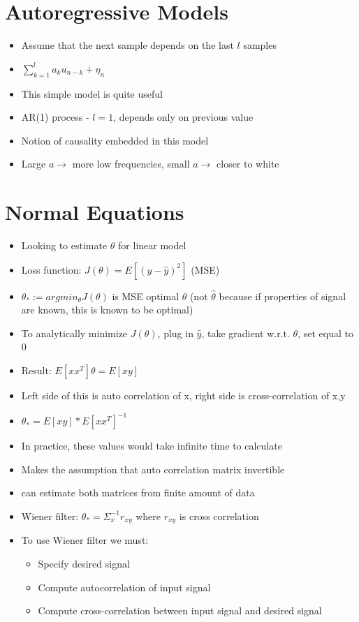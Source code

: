 \documentclass[12pt, letter]{article}
\begin{document}
\section{Autoregressive Models}%
\label{sec:autoregressive_models}
\begin{itemize}
	\item Assume that the next sample depends on the last $l$ samples
	\item $ \sum_{k=1}^{l} a_k u_{n-k} +\eta_n$
	\item This simple model is quite useful
	\item AR(1) process - $l=1$, depends only on previous value
	\item Notion of causality embedded in this model
	\item Large $a \to$ more low frequencies, small $a \to$ closer to white
\end{itemize}

\section{Normal Equations}%
\label{sec:normal_equations}
\begin{itemize}
	 \item Looking to estimate $\theta$ for linear model
	 \item Loss function: $J(\theta) = E[(y-\hat{y})^2]$ (MSE)
	 \item $\theta_* := argmin_\theta J(\theta)$ is MSE optimal $\theta$ (not $\hat{\theta}$ because if properties of signal are known, this is known to be optimal)
	 \item To analytically minimize $J(\theta)$, plug in $\hat{y}$, take gradient w.r.t. $\theta$, set equal to 0
	 \item Result: $E[x x^T]\theta = E[xy]$
	 \item Left side of this is auto correlation of x, right side is cross-correlation of x,y
	 \item $\theta_* = E[xy] * E[x x^T]^{-1}$
	 \item In practice, these values would take infinite time to calculate
	 \item Makes the assumption that auto correlation matrix invertible
	 \item can estimate both matrices from finite amount of data
	 \item Wiener filter: $\theta_* = \Sigma_x^{-1} r_{xy}$ where  $r_{xy}$ is cross correlation
	 \item To use Wiener filter we must:
	 \begin{itemize}
	 	 \item Specify desired signal
		 \item Compute autocorrelation of input signal
		 \item Compute cross-correlation between input signal and desired signal
	 \end{itemize}
\end{itemize}
\end{document}
